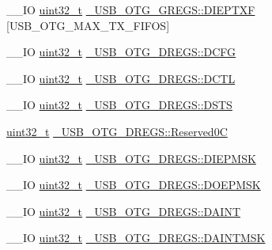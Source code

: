 \begin{DoxyCompactItemize}
\item 
\-\_\-\-\_\-\-I\-O \hyperlink{stdint_8h_a435d1572bf3f880d55459d9805097f62}{uint32\-\_\-t} \hyperlink{group___u_s_b___o_t_g___d_r_i_v_e_r_ga61e664637457292abf91b0d35857da23}{\-\_\-\-U\-S\-B\-\_\-\-O\-T\-G\-\_\-\-G\-R\-E\-G\-S\-::\-D\-I\-E\-P\-T\-X\-F} \mbox{[}U\-S\-B\-\_\-\-O\-T\-G\-\_\-\-M\-A\-X\-\_\-\-T\-X\-\_\-\-F\-I\-F\-O\-S\mbox{]}
\item 
\-\_\-\-\_\-\-I\-O \hyperlink{stdint_8h_a435d1572bf3f880d55459d9805097f62}{uint32\-\_\-t} \hyperlink{group___u_s_b___o_t_g___d_r_i_v_e_r_ga330a64c75ae5e724ad919d92fb338100}{\-\_\-\-U\-S\-B\-\_\-\-O\-T\-G\-\_\-\-D\-R\-E\-G\-S\-::\-D\-C\-F\-G}
\item 
\-\_\-\-\_\-\-I\-O \hyperlink{stdint_8h_a435d1572bf3f880d55459d9805097f62}{uint32\-\_\-t} \hyperlink{group___u_s_b___o_t_g___d_r_i_v_e_r_ga03802e91c803d405c5c638bac352843d}{\-\_\-\-U\-S\-B\-\_\-\-O\-T\-G\-\_\-\-D\-R\-E\-G\-S\-::\-D\-C\-T\-L}
\item 
\-\_\-\-\_\-\-I\-O \hyperlink{stdint_8h_a435d1572bf3f880d55459d9805097f62}{uint32\-\_\-t} \hyperlink{group___u_s_b___o_t_g___d_r_i_v_e_r_gab3b0f0e7ce31a08207236f244f9d4873}{\-\_\-\-U\-S\-B\-\_\-\-O\-T\-G\-\_\-\-D\-R\-E\-G\-S\-::\-D\-S\-T\-S}
\item 
\hyperlink{stdint_8h_a435d1572bf3f880d55459d9805097f62}{uint32\-\_\-t} \hyperlink{group___u_s_b___o_t_g___d_r_i_v_e_r_ga961b96a4163073c4f0959d45496863a9}{\-\_\-\-U\-S\-B\-\_\-\-O\-T\-G\-\_\-\-D\-R\-E\-G\-S\-::\-Reserved0\-C}
\item 
\-\_\-\-\_\-\-I\-O \hyperlink{stdint_8h_a435d1572bf3f880d55459d9805097f62}{uint32\-\_\-t} \hyperlink{group___u_s_b___o_t_g___d_r_i_v_e_r_ga762132384dd834686a1b445129b31ead}{\-\_\-\-U\-S\-B\-\_\-\-O\-T\-G\-\_\-\-D\-R\-E\-G\-S\-::\-D\-I\-E\-P\-M\-S\-K}
\item 
\-\_\-\-\_\-\-I\-O \hyperlink{stdint_8h_a435d1572bf3f880d55459d9805097f62}{uint32\-\_\-t} \hyperlink{group___u_s_b___o_t_g___d_r_i_v_e_r_ga264367119e4ee34d16a59408031d7303}{\-\_\-\-U\-S\-B\-\_\-\-O\-T\-G\-\_\-\-D\-R\-E\-G\-S\-::\-D\-O\-E\-P\-M\-S\-K}
\item 
\-\_\-\-\_\-\-I\-O \hyperlink{stdint_8h_a435d1572bf3f880d55459d9805097f62}{uint32\-\_\-t} \hyperlink{group___u_s_b___o_t_g___d_r_i_v_e_r_gab6955618198becc31d1621906c42389c}{\-\_\-\-U\-S\-B\-\_\-\-O\-T\-G\-\_\-\-D\-R\-E\-G\-S\-::\-D\-A\-I\-N\-T}
\item 
\-\_\-\-\_\-\-I\-O \hyperlink{stdint_8h_a435d1572bf3f880d55459d9805097f62}{uint32\-\_\-t} \hyperlink{group___u_s_b___o_t_g___d_r_i_v_e_r_gaea0f7408d7142abdd751cd825b350a4f}{\-\_\-\-U\-S\-B\-\_\-\-O\-T\-G\-\_\-\-D\-R\-E\-G\-S\-::\-D\-A\-I\-N\-T\-M\-S\-K}

\end{DoxyCompactItemize}
